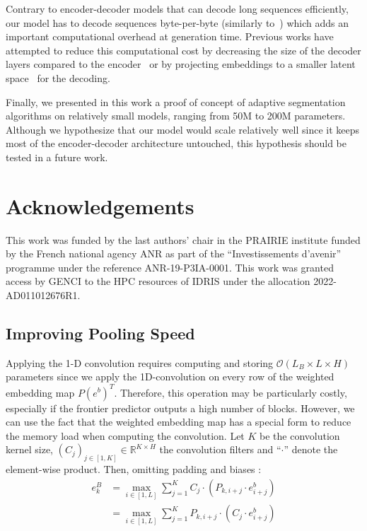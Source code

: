 Contrary to encoder-decoder models that can decode long sequences efficiently, our model has to decode sequences byte-per-byte (similarly to~\citet{clark2022canine,xue2022byt5,tay2021charformer}) which adds an important computational overhead at generation time. Previous works have attempted to reduce this computational cost by decreasing the size of the decoder layers compared to the encoder~\cite{xue2022byt5} or by projecting embeddings to a smaller latent space~\cite{jaegle2021perceiver} for the decoding.

Finally, we presented in this work a proof of concept of adaptive segmentation algorithms on relatively small models, ranging from 50M to 200M parameters. Although we hypothesize that our model would scale relatively well since it keeps most of the encoder-decoder architecture untouched, this hypothesis should be tested in a future work.

\section*{Acknowledgements}

This work was funded by the last authors' chair in the PRAIRIE institute funded by the French national agency ANR as part of the ``Investissements d'avenir'' programme under the reference ANR-19-P3IA-0001.
This work was granted access by GENCI to the HPC resources of IDRIS under the allocation 2022-AD011012676R1. 


\subsection{Improving Pooling Speed}
\label{sec:appendix_cache}
Applying the 1-D convolution requires computing and storing $\mathcal{O}(L_B\times L\times H)$ parameters since we apply the 1D-convolution on every row of the weighted embedding map $P({e^b})^T$. Therefore, this operation may be particularly costly, especially if the frontier predictor outputs a high number of blocks. However, we can use the fact that the weighted embedding map has a special form to reduce the memory load when computing the convolution. Let $K$ be the convolution kernel size, $(C_j)_{j\in [1,K]}\in \mathbb{R}^{K\times H}$ the convolution filters and ``$\cdot$'' denote the element-wise product. Then, omitting padding and biases :
\begin{align*}
    e^B_k &= \max \limits_{i\in [1,L]} \sum \limits_{j=1}^{K} C_j \cdot \left( P_{k,i+j} \cdot e^b_{i+j} \right) \\
          &= \max \limits_{i\in [1,L]} \sum \limits_{j=1}^{K} P_{k,i+j} \cdot \left( C_j \cdot e^b_{i+j} \right)
\end{align*}

